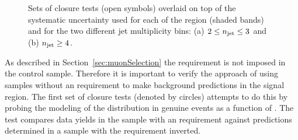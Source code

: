 \begin{figure}[h!]
  \begin{center}
     \\
     \\
    \caption{Sets of closure tests (open symbols) overlaid on top of
      the systematic uncertainty used for each of the \scalht
      region (shaded bands) and for the two different jet
      multiplicity bins: (a) $2 \leq n_{\text{jet}} \leq 3$ and (b) $n_{\text{jet}} \geq
      4$.  }
    \label{fig:closure}
  \end{center} 
\end{figure}

As described in Section~\ref{sec:muonSelection} the \alphat requirement is not imposed 
in the \mj control sample. Therefore it is important to verify the 
approach of using \mj samples without an \alphat requirement to 
make background predictions in the signal region.  The first set of
closure tests (denoted by circles) attempts to do this by probing
the modeling of the \alphat distribution in genuine \met events as a
function of \scalht.  The test compares data yields in the \mj
sample with an \alphat requirement against predictions determined in a
\mj sample with the \alphat requirement inverted. 

